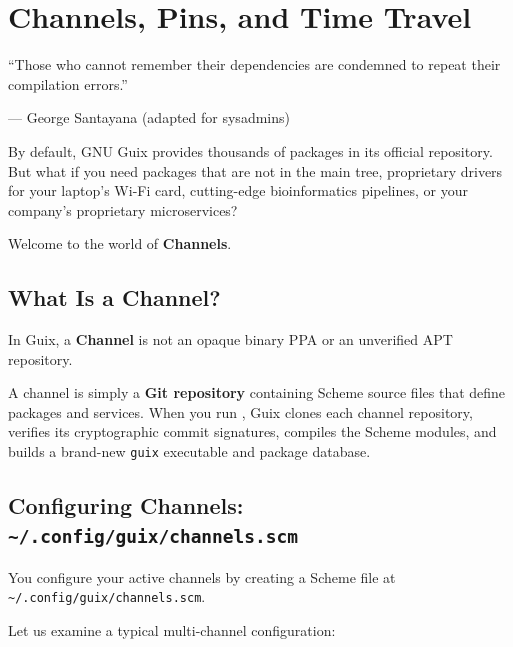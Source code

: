 \chapter{Channels, Pins, and Time Travel}
\label{chap:channels-and-time-travel}

\epigraph{``Those who cannot remember their dependencies are condemned to repeat their compilation errors.''}{--- George Santayana (adapted for sysadmins)}

\noindent
By default, GNU Guix provides thousands of packages in its official repository. But what if you need packages that are not in the main tree, proprietary drivers for your laptop's Wi-Fi card, cutting-edge bioinformatics pipelines, or your company's proprietary microservices?

Welcome to the world of \textbf{Channels}.

\section{What Is a Channel?}

In Guix, a \textbf{Channel} is not an opaque binary PPA or an unverified APT repository. 

A channel is simply a \textbf{Git repository} containing Scheme source files that define packages and services. When you run , Guix clones each channel repository, verifies its cryptographic commit signatures, compiles the Scheme modules, and builds a brand-new \texttt{guix} executable and package database.

\section{Configuring Channels: \texttt{\textasciitilde/.config/guix/channels.scm}}

You configure your active channels by creating a Scheme file at \texttt{\textasciitilde/.config/guix/channels.scm}.

Let us examine a typical multi-channel configuration:

